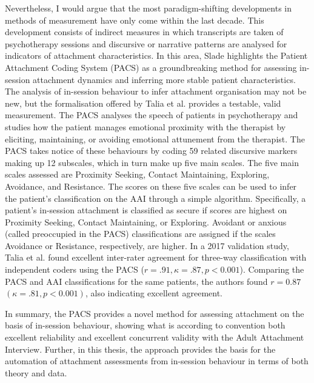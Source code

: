 \documentclass[12pt]{report}
\begin{document}
Nevertheless, I would argue that the most paradigm-shifting developments in methods of measurement have only come within the last decade.
This development consists of indirect measures in which transcripts are taken of psychotherapy sessions and discursive or narrative patterns are analysed for indicators of attachment characteristics.
In this area, Slade \citeyear{Slade2016} highlights the Patient Attachment Coding System (PACS) as a groundbreaking method for assessing in-session attachment dynamics and inferring more stable patient characteristics.
The analysis of in-session behaviour to infer attachment organisation may not be new, but the formalisation offered by Talia et al. \citeyear{Talia2017, Talia2014} provides a testable, valid measurement.
The PACS analyses the speech of patients in psychotherapy and studies how the patient manages emotional proximity with the therapist by eliciting, maintaining, or avoiding emotional attunement from the therapist.
The PACS takes notice of these behaviours by coding 59 related discursive markers making up 12 subscales, which in turn make up five main scales.
The five main scales assessed are Proximity Seeking, Contact Maintaining, Exploring, Avoidance, and Resistance.
The scores on these five scales can be used to infer the patient's classification on the AAI through a simple algorithm.
Specifically, a patient's in-session attachment is classified as secure if scores are highest on Proximity Seeking, Contact Maintaining, or Exploring.
Avoidant or anxious (called preoccupied in the PACS) classifications are assigned if the scales Avoidance or Resistance, respectively, are higher.
In a 2017 validation study, Talia et al. \citeyear{Talia2017} found excellent inter-rater agreement for three-way classification with independent coders using the PACS ($r=.91, \kappa = .87, p<0.001$).
Comparing the PACS and AAI classifications for the same patients, the authors found $r=0.87$ $(\kappa = .81, p<0.001)$, also indicating excellent agreement.

In summary, the PACS provides a novel method for assessing attachment on the basis of in-session behaviour, showing what is according to convention \cite{Cicchetti1994} both excellent reliability and excellent concurrent validity with the Adult Attachment Interview.
Further, in this thesis, the approach provides the basis for the automation of attachment assessments from in-session behaviour in terms of both theory and data.
\end{document}
